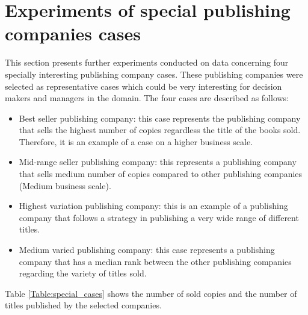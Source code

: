 \documentclass[a4paper,10pt,twocolumn,preprint,3p]{elsarticle}
\begin{document}

\section{Experiments of special publishing companies cases}
\label{sec:example_cases}

This section presents further experiments conducted on data concerning four 
specially interesting publishing company cases. These publishing companies were 
selected as representative cases which could be very interesting for decision 
makers and managers in the domain. The four cases are described as follows:

\begin{itemize}
    \item Best seller publishing company: this case represents the publishing company that sells the highest number of copies regardless the title of the books sold. Therefore, it is an example of a case on a higher business scale.
    \item Mid-range seller publishing company: this represents a publishing company that sells medium number of copies compared to other publishing companies (Medium business scale). 
    \item Highest variation publishing company: this is an example of a publishing company that follows a strategy in publishing a very wide range of different titles.
    \item Medium varied publishing company: this case represents a publishing company that has a median rank between the other publishing companies regarding the variety of titles sold.
\end{itemize}


Table \ref{Table:special_cases} shows the number of sold copies and the number 
of titles published by the selected companies.

\begin{table*}
\caption{Description of publishing companies considered as special cases.}
\centering{}%
\label{Table:special_cases}
\end{table*}
\end{document}
